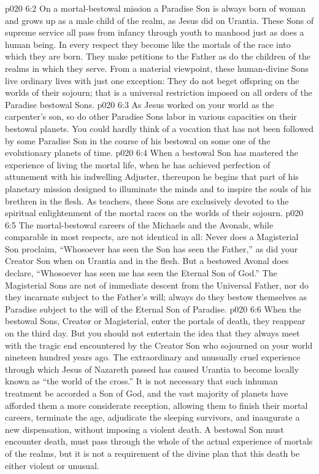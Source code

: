 \vs p020 6:2 \pc On a mortal\hyp{}bestowal mission a Paradise Son is always born of woman and grows up as a male child of the realm, as Jesus did on Urantia. These Sons of supreme service all pass from infancy through youth to manhood just as does a human being. In every respect they become like the mortals of the race into which they are born. They make petitions to the Father as do the children of the realms in which they serve. From a material viewpoint, these human\hyp{}divine Sons live ordinary lives with just one exception: They do not beget offspring on the worlds of their sojourn; that is a universal restriction imposed on all orders of the Paradise bestowal Sons.
\vs p020 6:3 As Jesus worked on your world as the carpenter’s son, so do other Paradise Sons labor in various capacities on their bestowal planets. You could hardly think of a vocation that has not been followed by some Paradise Son in the course of his bestowal on some one of the evolutionary planets of time.
\vs p020 6:4 When a bestowal Son has mastered the experience of living the mortal life, when he has achieved perfection of attunement with his indwelling Adjuster, thereupon he begins that part of his planetary mission designed to illuminate the minds and to inspire the souls of his brethren in the flesh. As teachers, these Sons are exclusively devoted to the spiritual enlightenment of the mortal races on the worlds of their sojourn.
\vs p020 6:5 \pc The mortal\hyp{}bestowal careers of the Michaels and the Avonals, while comparable in most respects, are not identical in all: Never does a Magisterial Son proclaim, \textcolor{ubdarkred}{“Whosoever has seen the Son has seen the Father,”} as did your Creator Son when on Urantia and in the flesh. But a bestowed Avonal does declare, “Whosoever has seen me has seen the Eternal Son of God.” The Magisterial Sons are not of immediate descent from the Universal Father, nor do they incarnate subject to the Father’s will; always do they bestow themselves as Paradise  subject to the will of the Eternal Son of Paradise.
\vs p020 6:6 \pc When the bestowal Sons, Creator or Magisterial, enter the portals of death, they reappear on the third day. But you should not entertain the idea that they always meet with the tragic end encountered by the Creator Son who sojourned on your world nineteen hundred years ago. The extraordinary and unusually cruel experience through which Jesus of Nazareth passed has caused Urantia to become locally known as “the world of the cross.” It is not necessary that such inhuman treatment be accorded a Son of God, and the vast majority of planets have afforded them a more considerate reception, allowing them to finish their mortal careers, terminate the age, adjudicate the sleeping survivors, and inaugurate a new dispensation, without imposing a violent death. A bestowal Son must encounter death, must pass through the whole of the actual experience of mortals of the realms, but it is not a requirement of the divine plan that this death be either violent or unusual.
